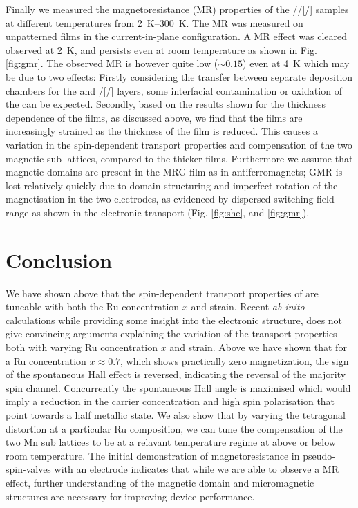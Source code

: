 \documentclass[reprint,aip,apl,floatfix,linenumbers,superscriptaddress]{revtex4-1}
\begin{document}
Finally we measured the magnetoresistance (MR) properties of the //[/] samples at different temperatures from \SIrange{2}{300}{\kelvin}. The MR was measured on unpatterned films in the current-in-plane configuration. A MR effect was cleared observed at \SI{2}{\kelvin}, and persists even at room temperature as shown in Fig. \ref{fig:gmr}. The observed MR is however quite low ($\sim \num{0.15}$) even at \SI{4}{\kelvin} which may be due to two effects: Firstly considering the transfer between separate deposition chambers for the  and /[/] layers, some interfacial contamination or oxidation of the  can be expected.  Secondly, based on the results shown for the thickness dependence of the  films, as discussed above, we find that the films are increasingly strained as the thickness of the film is reduced. This causes a variation in the spin-dependent transport properties and compensation of the two magnetic sub lattices, compared to the thicker films. Furthermore we assume that magnetic domains are present in the MRG film as in antiferromagnets; GMR is lost relatively quickly due to domain structuring and imperfect rotation of the magnetisation in the two electrodes, as evidenced by dispersed switching field range as shown in the electronic transport (Fig. \ref{fig:she}, and \ref{fig:gmr}).

\section{Conclusion}
\label{sec:conclusion}
We have shown above that the spin-dependent transport properties of  are tuneable with both the Ru concentration $x$ and strain. Recent \textit{ab inito} calculations \cite{galanakisJAP2013} while providing some insight into the electronic structure, does not give convincing arguments explaining the variation of the transport properties both with varying Ru concentration $x$ and strain. Above we have shown that for a Ru concentration $x\approx\num{0.7}$, which shows practically zero magnetization, the sign of the spontaneous Hall effect is reversed, indicating the reversal of the majority spin channel. Concurrently the spontaneous Hall angle is maximised which would imply a reduction in the carrier concentration and high spin polarisation that point towards a half metallic state. We also show that by varying the tetragonal distortion at a particular Ru composition, we can tune the compensation of the two Mn sub lattices to be at a relavant temperature regime at above or below room temperature. 
The initial demonstration of magnetoresistance in pseudo-spin-valves with an  electrode indicates that while we are able to observe a MR effect, further understanding of the magnetic domain and micromagnetic structures are necessary for improving device performance. 
 
\end{document}
